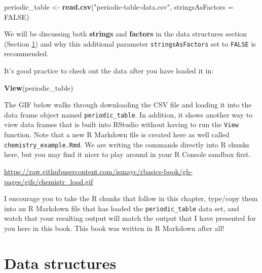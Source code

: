 \documentclass[]{tufte-book}
\newenvironment{Shaded}{\begin{snugshade}}{\end{snugshade}}
\newcommand{\KeywordTok}[1]{\textcolor[rgb]{0.13,0.29,0.53}{\textbf{{#1}}}}
\newcommand{\DataTypeTok}[1]{\textcolor[rgb]{0.13,0.29,0.53}{{#1}}}
\newcommand{\StringTok}[1]{\textcolor[rgb]{0.31,0.60,0.02}{{#1}}}
\newcommand{\OtherTok}[1]{\textcolor[rgb]{0.56,0.35,0.01}{{#1}}}
\newcommand{\NormalTok}[1]{{#1}}
\theoremstyle{definition}
\theoremstyle{definition}
\theoremstyle{remark}
\begin{document}
\begin{Shaded}
\begin{Highlighting}[]
\NormalTok{periodic_table <-}\StringTok{ }\KeywordTok{read.csv}\NormalTok{(}\StringTok{"periodic-table-data.csv"}\NormalTok{,}
                           \DataTypeTok{stringsAsFactors =} \OtherTok{FALSE}\NormalTok{)}
\end{Highlighting}
\end{Shaded}

We will be discussing both \textbf{strings} and \textbf{factors} in the
data structures section (Section \ref{data-structures}) and why this
additional parameter \texttt{stringsAsFactors} set to \texttt{FALSE} is
recommended.

It's good practice to check out the data after you have loaded it in:

\begin{Shaded}
\begin{Highlighting}[]
\KeywordTok{View}\NormalTok{(periodic_table)}
\end{Highlighting}
\end{Shaded}

The GIF below walks through downloading the CSV file and loading it into
the data frame object named \texttt{periodic\_table}. In addition, it
shows another way to view data frames that is built into RStudio without
having to run the \texttt{View} function. Note that a new R Markdown
file is created here as well called \texttt{chemistry\_example.Rmd}. We
are writing the commands directly into R chunks here, but you may find
it nicer to play around in your R Console sandbox first.

\vspace{0.1in}

\begin{center}\footnotesize{\url{https://raw.githubusercontent.com/ismayc/rbasics-book/gh-pages/gifs/chemistr_load.gif}}\end{center}

\vspace{0.1in}

I encourage you to take the R chunks that follow in this chapter,
type/copy them into an R Markdown file that has loaded the
\texttt{periodic\_table} data set, and watch that your resulting output
will match the output that I have presented for you here in this book.
This book was written in R Markdown after all!

\section{Data structures}\label{data-structures}
\end{document}

